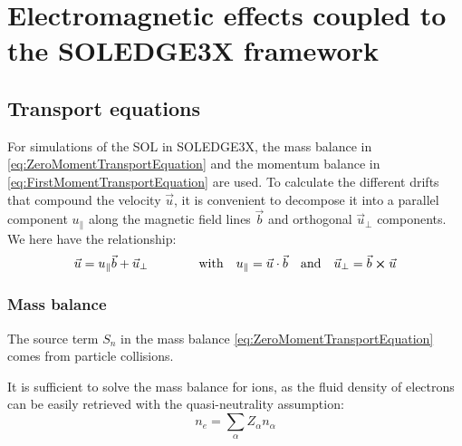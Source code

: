 \chapter{Electromagnetic effects coupled to the SOLEDGE3X framework}
\label{chap:SOLEDGE3X_framework}

\section{Transport equations}
\label{sec:S3X_equations}
For simulations of the SOL in SOLEDGE3X, the mass balance in \ref{eq:ZeroMomentTransportEquation} and the momentum balance in \ref{eq:FirstMomentTransportEquation} are used. To calculate the different drifts that compound the velocity $\vec{u}$, it is convenient to decompose it into a parallel component $u_\parallel$ along the magnetic field lines $\vec{b}$ and orthogonal $\vec{u}_\perp$ components. We here have the relationship:
\begin{equation}
	\label{eq:RelationPerpParallelVelocity}
	\vec{u} = u_\parallel \vec{b} + \vec{u}_\perp \qquad\qquad \text{with} \quad u_\parallel = \vec{u}\cdot\vec{b} \quad \text{and} \quad \vec{u}_\perp = \vec{b}\cross\vec{u}
\end{equation}

\subsection{Mass balance}
The source term $S_n$ in the mass balance \ref{eq:ZeroMomentTransportEquation} comes from particle collisions. 


It is sufficient to solve the mass balance for ions, as the fluid density of electrons can be easily retrieved with the quasi-neutrality assumption:
\begin{equation}
	n_e = \sum_{\alpha}Z_\alpha n_\alpha
\end{equation}

